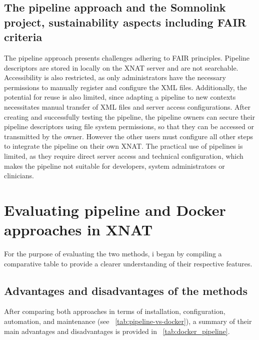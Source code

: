\subsection{The pipeline approach and the Somnolink project, sustainability aspects including FAIR criteria}
The pipeline approach presents challenges adhering to FAIR principles.
Pipeline descriptors are stored in locally on the XNAT server and are not searchable.
Accessibility is also restricted, as only administrators have the necessary permissions to manually register and configure the XML files.
Additionally, the potential for reuse is also limited, since adapting a pipeline to new contexts necessitates manual transfer of XML files and server access configurations. 
After creating and successfully testing the pipeline, the pipeline owners can secure their pipeline descriptors using file system permissions, so that they can be accessed or transmitted by the owner. However the other users must configure all other steps to integrate the pipeline on their own XNAT.
The practical use of pipelines is limited, as they require direct server access and technical configuration, which makes the pipeline not suitable for developers, system administrators or clinicians.


\section{Evaluating pipeline and Docker approaches in XNAT}

For the purpose of evaluating the two methods, i began by compiling a comparative table to provide a clearer understanding of their respective features.

\subsection{Advantages and disadvantages of the methods}

After comparing both approaches in terms of installation, configuration, automation, and maintenance (see ~\autoref{tab:pipeline-vs-docker}), a summary of their main advantages and disadvantages is provided in ~\autoref{tab:docker_pipeline}.

